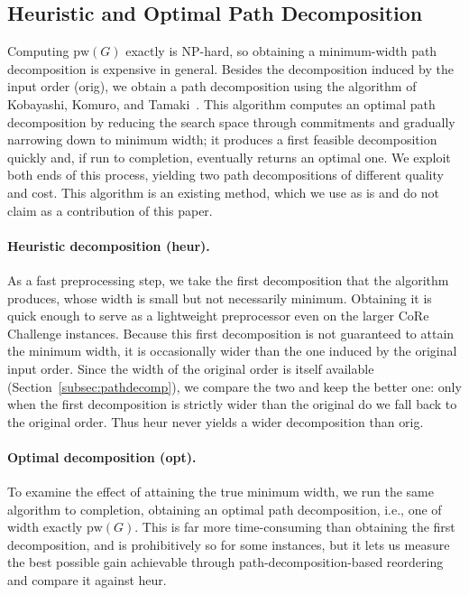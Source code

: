 \documentclass[conference]{IEEEtran}
\newcommand{\OrigDecom}{\textsf{orig}\xspace}
\newcommand{\HeurDecom}{\textsf{heur}\xspace}
\newcommand{\OptDecom}{\textsf{opt}\xspace}
\begin{document}
\subsection{Heuristic and Optimal Path Decomposition}
\label{subsec:algorithms}

Computing $\mathrm{pw}(G)$ exactly is NP-hard, so obtaining a minimum-width path
decomposition is expensive in general. Besides the decomposition induced by the
input order (\OrigDecom), we obtain a path decomposition using the algorithm of
Kobayashi, Komuro, and Tamaki~\cite{KobayashiKomuroTamaki2014}. This algorithm
computes an optimal path decomposition by reducing the search space through
commitments and gradually narrowing down to minimum width; it produces a first
feasible decomposition quickly and, if run to completion, eventually returns an
optimal one. We exploit both ends of this process, yielding two path
decompositions of different quality and cost. This algorithm is an existing
method, which we use as is and do not claim as a contribution of this paper.

\paragraph{Heuristic decomposition (\HeurDecom).}
As a fast preprocessing step, we take the first decomposition that the algorithm
produces, whose width is small but not necessarily minimum. Obtaining it is
quick enough to serve as a lightweight preprocessor even on the larger CoRe
Challenge instances. Because this first decomposition is not guaranteed to attain
the minimum width, it is occasionally wider than the one induced by the original
input order. Since the width of the original order is itself available
(Section~\ref{subsec:pathdecomp}), we compare the two and keep the better one:
only when the first decomposition is strictly wider than the original do we fall
back to the original order. Thus \HeurDecom never yields a wider decomposition
than \OrigDecom.

\paragraph{Optimal decomposition (\OptDecom).}
To examine the effect of attaining the true minimum width, we run the same
algorithm to completion, obtaining an optimal path decomposition, i.e., one of
width exactly $\mathrm{pw}(G)$. This is far more time-consuming than obtaining the
first decomposition, and is prohibitively so for some instances, but it lets us
measure the best possible gain achievable through path-decomposition-based
reordering and compare it against \HeurDecom.
\end{document}
